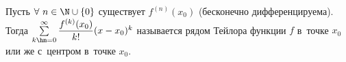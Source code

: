 
    Пусть $\forall\  n\in\N\cup\{0\}$ существует $f^{(n)}(x_0)$ (бесконечно дифференцируема).\\ Тогда $\sum\limits_{k\hm=0}^{\infty}\dfrac{f^{(k)}(x_0)}{k!}(x-x_0)^k$
    называется рядом Тейлора функции $f$ в~точке $x_0$ или же с~центром в~точке $x_0$.
